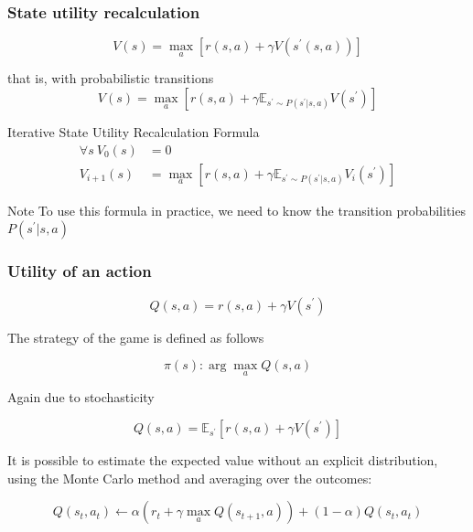\documentclass[fullscreen=true, bookmarks=true, hyperref={pdfencoding=unicode}]{beamer}
\begin{document}
\begin{frame}
  \frametitle{State utility recalculation}

    $$V(s) = \max\limits_a [r(s, a) + \gamma V(s^\prime (s, a))]$$

    \vspace{0.5cm}
    that is, with probabilistic transitions
    $$V(s) = \max\limits_a [r(s, a) + \gamma \mathbb{E}_{s^\prime \sim P(s^\prime | s, a)} V(s^ \prime)]$$

    \vspace{0.5cm}
    Iterative State Utility Recalculation Formula
    \begin{align*}
      \forall s \ V_0(s) &= 0 \\
      V_{i+1}(s) &= \max\limits_a [r(s, a) + \gamma \mathbb{E}_{s^\prime \sim P(s^\prime | s, a)} V_{i}(s^\prime)]
    \end{align*}
    \pause
    \begin{block}{Note}
      To use this formula in practice,
      we need to know the transition probabilities $P(s^\prime| s, a)$
    \end{block}
\end{frame}


\begin{frame}
  \frametitle{Utility of an action}

    $$Q(s, a) = r(s, a) + \gamma V(s^\prime)$$

    The strategy of the game is defined as follows

    $$\pi(s) : \arg\max\limits_a Q(s, a)$$

    \pause
    Again due to stochasticity

    $$Q(s, a) = \mathbb{E}_{s^\prime} [r(s, a) + \gamma V(s^\prime)]$$

    It is possible to estimate the expected value without an explicit distribution, using the Monte Carlo method and averaging over the outcomes:

    $$Q(s_t, a_t) \leftarrow \alpha \left(r_t+\gamma \max\limits_a Q(s_{t+1}, a) \right)
    + (1-\alpha) Q(s_{t}, a_{t})$$
\end{frame}
\end{document}
